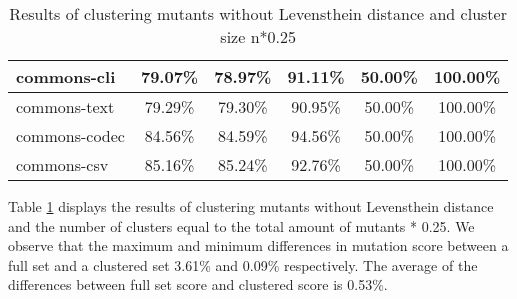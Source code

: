 \documentclass[../../main]{subfiles}
\begin{document}
\begin{table}[htb]
\begin{tabular}{|l|c|c|c|c|c|}
commons-cli                   & 79.07\%                                                                                 & 78.97\%                                                                                     & 91.11\%                                                                              & 50.00\%                                                                               & 100.00\%                                                                             \\ \hline
commons-text                  & 79.29\%                                                                                 & 79.30\%                                                                                     & 90.95\%                                                                              & 50.00\%                                                                               & 100.00\%                                                                             \\ \hline
commons-codec                 & 84.56\%                                                                                 & 84.59\%                                                                                     & 94.56\%                                                                              & 50.00\%                                                                               & 100.00\%                                                                             \\ \hline
commons-csv                   & 85.16\%                                                                                 & 85.24\%                                                                                     & 92.76\%                                                                              & 50.00\%                                                                               & 100.00\%                                                                             \\ \hline
\end{tabular}
\caption{\label{tab:clustering_no_distance_25}Results of clustering mutants without Levensthein distance and cluster size n*0.25}
\end{table}
\FloatBarrier

Table \ref{tab:clustering_no_distance_25} displays the results of clustering mutants without Levensthein distance and the number of clusters equal to the total amount of mutants * 0.25. 
We observe that the maximum and minimum differences in mutation score between a full set and a clustered set  3.61\% and 0.09\% respectively.
The average of the differences between full set score and clustered score is 0.53\%.
\end{document}
